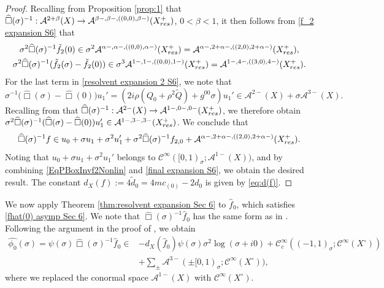 \documentclass[10pt,a4paper,reqno]{amsart}
\newcommand{\CI}{\mathcal{C}^\infty}
\newcommand{\CcI}{\mathcal{C}_c^\infty}
\newcommand{\A}{\mathcal{A}}
\let\pminus\pm
\renewcommand{\pm}{\phi_{\le m}}
\theoremstyle{definition}
\theoremstyle{remark}
\numberwithin{equation}{section}
\newcommand{\wh}{\widehat}
\begin{document}
\begin{proof}
\noindent
Recalling from Proposition \ref{prop:1} that $\wh\Box(\sigma)^{-1}: \A^{2+\beta}(X) \to \A^{\beta-,\beta-,((0,0),\beta-)}(X_{\rm{res}}^+)$, $0<\beta<1$, it then follows from \eqref{f_2 expansion S6} that
\[
\begin{gathered}
    \sigma^2\wh\Box(\sigma)^{-1}\Tilde{f}_2(0) \in \sigma^2 \A^{\alpha-,\alpha-,((0,0),\alpha-)}(X_{\rm{res}}^+) = \A^{\alpha-,2+\alpha-,((2,0),2+\alpha-)}(X_{\rm{res}}^+), \\
    \sigma^2\wh\Box(\sigma)^{-1}(\Tilde{f}_2(\sigma) - \Tilde{f}_2(0)) \in \sigma^3 \A^{1-,1-,((0,0),1-)}(X_{\rm{res}}^+) = \A^{1-,4-,((3,0),4-)}(X_{\rm{res}}^+).
\end{gathered}
\]
For the last term in \eqref{resolvent expansion 2 S6}, we note that
\[
    \sigma^{-1}\bigl(\wh\Box(\sigma)-\wh\Box(0)\bigr)u_1' = (2i\rho(Q_0 + \rho^2\widetilde{Q})+g^{00}\sigma)u_1' \in \A^{2-}(X) + \sigma \A^{3-}(X).
\]
Recalling from \cite[Lemma 2.17]{Hin22} that $\wh\Box(\sigma)^{-1}: \A^{2-}(X)\to \A^{1-,0-,0-}(X_{\rm{res}}^+)$, we therefore obtain $\sigma^2\wh\Box(\sigma)^{-1} (\wh\Box(\sigma)-\wh\Box(0))u_1' \in \A^{1-,3-,3-}(X_{\rm{res}}^+)$. We conclude that
\begin{equation}
\label{final expansion S6}
    \wh\Box(\sigma)^{-1} f \in u_0 + \sigma u_1 + \sigma^2 u_1' + \sigma^2\wh\Box(\sigma)^{-1}f_{2,0} + \A^{\alpha-,2+\alpha-,((2,0),2+\alpha-)}(X_{\rm{res}}^+).
\end{equation}
Noting that $u_0 + \sigma u_1 + \sigma^2 u_1'$ belongs to $\CI([0,1)_\sigma;\A^{1-}(X))$, and by combining \eqref{EqPBoxInvf2Nonlin} and \eqref{final expansion S6}, we obtain the desired result. The constant $d_X(f) := 4\tilde{d}_0 = 4mc_{(0)} - 2d_0$ is given by \eqref{eq:d(f)}. 
\end{proof} 

We now apply Theorem \ref{thm:resolvent expansion Sec 6} to $\wh{f}_0$, which satisfies \eqref{fhat(0) asymp Sec 6}. We note that $\wh\Box(\sigma)^{-1}\wh{f}_0$ has the same form as in \cite[Theorem 3.1]{Hin22}. Following the argument in the proof of \cite[Theorem 3.4]{Hin22}, we obtain
\begin{equation}
\label{eq:phi0hat Sec 6}
    \begin{split}
     \widehat{\phi_0}(\sigma)=\psi(\sigma) \wh\Box(\sigma)^{-1} \wh{f}_0 \in &-d_X(\wh{f}_0)\psi(\sigma)\sigma^2\log(\sigma+i0)+\CcI((-1,1)_\sigma;\CI(X^\circ))\\ &+\sum_{\pminus} \A^{3-}(\pminus[0,1)_\sigma;\CI(X^\circ)),
\end{split}
\end{equation}
where we replaced the conormal space $\A^{1-}(X)$ with $\CI(X^\circ)$.
\end{document}
